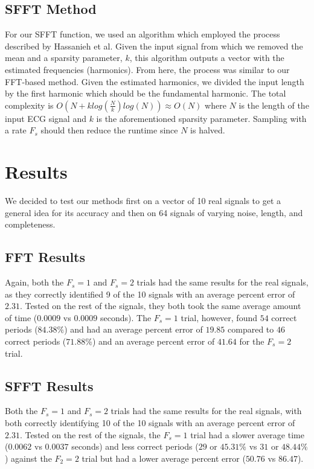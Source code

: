 \documentclass[twocolumn]{article}
\begin{document}
\begin{flushleft}
		\hspace{2em}\subsection{SFFT Method}
		For our SFFT function, we used an algorithm which employed the process described by Hassanieh et al\cite{paperSFFT}. Given the input signal from which we removed the mean and a sparsity parameter, $k$, this algorithm outputs a vector with the estimated frequencies (harmonics). From here, the process was similar to our FFT-based method. Given the estimated harmonics, we divided the input length by the first harmonic which should be the fundamental harmonic. The total complexity is $O(N + klog(\frac{N}{k})log(N))\approx O(N)$ where $N$ is the length of the input ECG signal and $k$ is the aforementioned sparsity parameter. Sampling with a rate $F_{s}$ should then reduce the runtime since $N$ is halved.  \\ \vspace{-1em}
		
		\section{Results}
		We decided to test our methods first on a vector of 10 real signals to get a general idea for its accuracy and then on 64 signals of varying noise, length, and completeness. \\ \vspace{-2em}
		
		\hspace{2em}\subsection{FFT Results} \label{ssec:resultsFFT}
		Again, both the $F_{s}=1$ and $F_{s}=2$ trials had the same results for the real signals, as they correctly identified 9 of the 10 signals with an average percent error of $2.31$. Tested on the rest of the signals, they both took the same average amount of time ($0.0009$ vs $0.0009$ seconds). The $F_{s}=1$ trial, however, found $54$ correct periods ($84.38\%$) and had an average percent error of $19.85$ compared to $46$ correct periods ($71.88\%$) and an average percent error of $41.64$ for the $F_{s}=2$ trial. \\ \vspace{-2em}
		
		\hspace{2em}\subsection{SFFT Results}  \label{ssec:resultsSFFT}
		Both the $F_{s}=1$ and $F_{s}=2$ trials had the same results for the real signals, with both correctly identifying 10 of the 10 signals with an average percent error of $2.31$. Tested on the rest of the signals, the $F_{s}=1$ trial had a slower average time ($0.0062$ vs $0.0037$ seconds) and less correct periods ($29$  or $45.31\%$ vs $31$ or $48.44\%$) against the $F_{2}=2$ trial but had a lower average percent error ($50.76$ vs $86.47$). \\ \vspace{-1em}


\end{flushleft}
\end{document}

